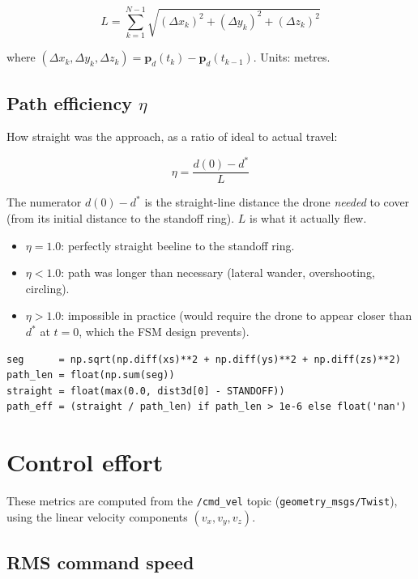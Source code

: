 \documentclass[11pt,a4paper]{article}
\begin{document}
\[
  L = \sum_{k=1}^{N-1}
      \sqrt{(\Delta x_k)^2 + (\Delta y_k)^2 + (\Delta z_k)^2}
\]

where $(\Delta x_k, \Delta y_k, \Delta z_k) = \mathbf{p}_d(t_{k}) - \mathbf{p}_d(t_{k-1})$.
Units: metres.

\subsection{Path efficiency \boldmath$\eta$}

How straight was the approach, as a ratio of ideal to actual travel:

\[
  \eta = \frac{d(0) - d^*}{L}
\]

The numerator $d(0) - d^*$ is the straight-line distance the drone
\emph{needed} to cover (from its initial distance to the standoff ring).
$L$ is what it actually flew.

\begin{itemize}
  \item $\eta = 1.0$: perfectly straight beeline to the standoff ring.
  \item $\eta < 1.0$: path was longer than necessary (lateral wander, overshooting, circling).
  \item $\eta > 1.0$: impossible in practice (would require the drone to appear
        closer than $d^*$ at $t=0$, which the FSM design prevents).
\end{itemize}

\begin{lstlisting}
seg      = np.sqrt(np.diff(xs)**2 + np.diff(ys)**2 + np.diff(zs)**2)
path_len = float(np.sum(seg))
straight = float(max(0.0, dist3d[0] - STANDOFF))
path_eff = (straight / path_len) if path_len > 1e-6 else float('nan')
\end{lstlisting}

\section{Control effort}

These metrics are computed from the \texttt{/cmd\_vel} topic
(\texttt{geometry\_msgs/Twist}), using the linear velocity components
$(v_x, v_y, v_z)$.

\subsection{RMS command speed}
\end{document}
